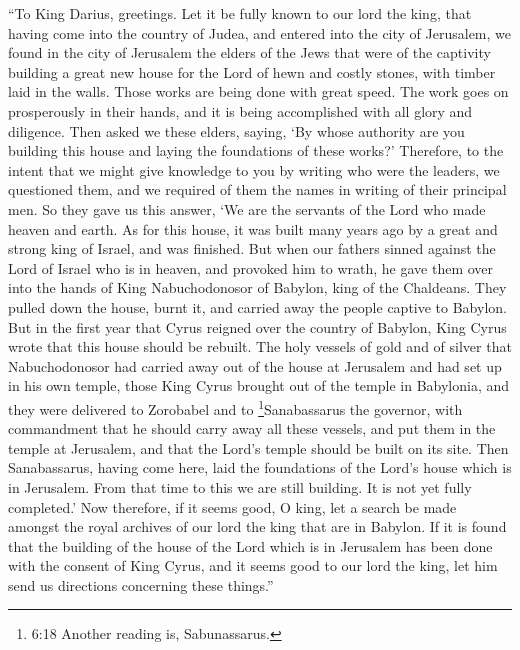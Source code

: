  ``To King Darius, greetings. Let it be fully known to our
lord the king, that having come into the country of Judea, and entered
into the city of Jerusalem, we found in the city of Jerusalem the elders
of the Jews that were of the captivity  building a great new
house for the Lord of hewn and costly stones, with timber laid in the
walls.  Those works are being done with great speed. The
work goes on prosperously in their hands, and it is being accomplished
with all glory and diligence.  Then asked we these elders,
saying, `By whose authority are you building this house and laying the
foundations of these works?'  Therefore, to the intent that
we might give knowledge to you by writing who were the leaders, we
questioned them, and we required of them the names in writing of their
principal men.  So they gave us this answer, `We are the
servants of the Lord who made heaven and earth.  As for
this house, it was built many years ago by a great and strong king of
Israel, and was finished.  But when our fathers sinned
against the Lord of Israel who is in heaven, and provoked him to wrath,
he gave them over into the hands of King Nabuchodonosor of Babylon, king
of the Chaldeans.  They pulled down the house, burnt it,
and carried away the people captive to Babylon.  But in the
first year that Cyrus reigned over the country of Babylon, King Cyrus
wrote that this house should be rebuilt.  The holy vessels
of gold and of silver that Nabuchodonosor had carried away out of the
house at Jerusalem and had set up in his own temple, those King Cyrus
brought out of the temple in Babylonia, and they were delivered to
Zorobabel and to \footnote{6:18 Another reading is, Sabunassarus.}Sanabassarus
the governor,  with commandment that he should carry away
all these vessels, and put them in the temple at Jerusalem, and that the
Lord's temple should be built on its site.  Then
Sanabassarus, having come here, laid the foundations of the Lord's house
which is in Jerusalem. From that time to this we are still building. It
is not yet fully completed.'  Now therefore, if it seems
good, O king, let a search be made amongst the royal archives of our
lord the king that are in Babylon.  If it is found that the
building of the house of the Lord which is in Jerusalem has been done
with the consent of King Cyrus, and it seems good to our lord the king,
let him send us directions concerning these things.''

